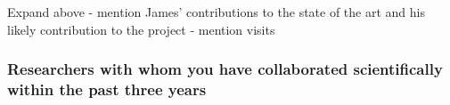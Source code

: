 \documentclass[10pt,fleqn,twoside]{article}
\newcommand{\Tcol}{\color{blue}}
\begin{document}
{\color{red} Expand above - mention James' contributions to the state
  of the art and his likely contribution to the project - mention visits}

\subsubsection{\Tcol Researchers with whom you have collaborated scientifically within the past three years}


\end{document}
